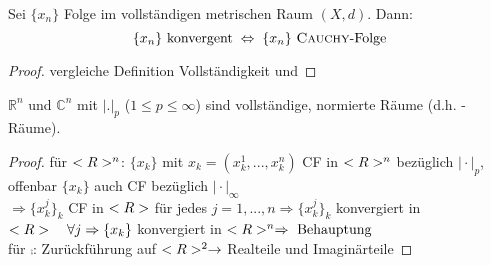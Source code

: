 \begin{conclusion}
	Sei $\{x_n\}$ Folge im vollständigen metrischen Raum $(X,d)$. Dann:\[ \{x_n\}\text{ konvergent}\;\Leftrightarrow\; \{x_n\} \text{ \textsc{Cauchy}-Folge} \]
\end{conclusion}
\begin{proof}
	vergleiche Definition Vollständigkeit und 
\end{proof}

\begin{theorem}
	$\mathbb{R}^n$ und $\mathbb{C}^n$ mit $|.|_p$ ($1\le p \le \infty$) sind vollständige, normierte Räume (d.h. -Räume).
\end{theorem}
\begin{proof}
	für $<R>^n$: $\{x_k\}$ mit $x_k=(x^1_k,...,x^n_k)$ CF in $<R>^n$ bezüglich $\vert\cdot\vert_p$, offenbar $\{x_k\}$ auch CF bezüglich $\vert\cdot\vert_\infty$ \\
	$\Rightarrow \{x^j_k\}_k$ CF in $<R>$ für jedes $j=1,...,n\Rightarrow \{x^j_k\}_k$ konvergiert in $<R>\quad\forall j\Rightarrow \{x_k\}$ konvergiert in $<R>^n\Rightarrow \text{ Behauptung}$ \\
	für $\comp$: Zurückführung auf $<R>^2\to$ Realteile und Imaginärteile
\end{proof}